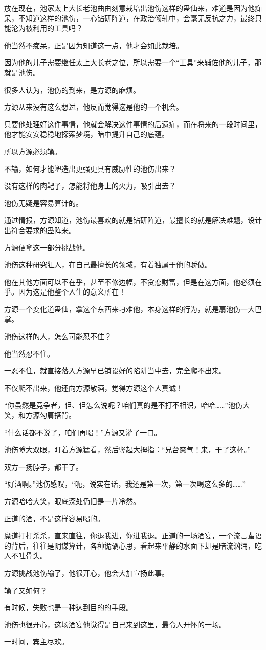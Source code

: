 \begin{this_body}
放在现在，池家太上大长老池曲由刻意栽培出池伤这样的蛊仙来，难道是因为他痴呆，不知道这样的池伤，一心钻研阵道，在政治倾轧中，会毫无反抗之力，最终只能沦为被利用的工具吗？

他当然不痴呆，正是因为知道这一点，他才会如此栽培。

因为他的儿子需要继任太上大长老之位，所以需要一个“工具”来辅佐他的儿子，那就是池伤。

很多人认为，池伤的到来，是方源的麻烦。

方源从来没有这么想过，他反而觉得这是他的一个机会。

只要他处理好这件事情，他就会解决这件事情的后遗症，而在将来的一段时间里，他才能安安稳稳地探索梦境，暗中提升自己的底蕴。

所以方源必须输。

不输，如何才能塑造出更强更具有威胁性的池伤出来？

没有这样的肉靶子，怎能将他身上的火力，吸引出去？

池伤无疑是容易算计的。

通过情报，方源知道，池伤最喜欢的就是钻研阵道，最擅长的就是解决难题，设计出符合要求的蛊阵来。

方源便拿这一部分挑战他。

池伤这种研究狂人，在自己最擅长的领域，有着独属于他的骄傲。

他在其他方面可以不在乎，甚至不修边幅，不贪恋财富，但是在这方面，他必须在乎。因为这是他整个人生的意义所在！

方源一个变化道蛊仙，拿这个东西来刁难他，本身这样的行为，就是扇池伤一大巴掌。

池伤这样的人，怎么可能忍不住？

他当然忍不住。

一忍不住，就直接落入方源早已铺设好的陷阱当中去，完全爬不出来。

不仅爬不出来，他还向方源敬酒，觉得方源这个人真诚！

“你虽然是竞争者，但、但怎么说呢？咱们真的是不打不相识，哈哈……”池伤大笑，和方源勾肩搭背。

“什么话都不说了，咱们再喝！”方源又灌了一口。

池伤瞪大双眼，盯着方源猛看，然后竖起大拇指：“兄台爽气！来，干了这杯。”

双方一扬脖子，都干了。

“好酒啊。”池伤感叹，“呃，说实在话，我还是第一次，第一次喝这么多的……”

方源哈哈大笑，眼底深处仍旧是一片冷然。

正道的酒，不是这样容易喝的。

魔道打打杀杀，直来直往，你退我进，你进我退。正道的一场酒宴，一个流言蜚语的背后，往往是阴谋算计，各种诡谲心思，看起来平静的水面下却是暗流汹涌，吃人不吐骨头。

方源挑战池伤输了，他很开心，他会大加宣扬此事。

输了又如何？

有时候，失败也是一种达到目的的手段。

池伤也很开心，这场酒宴他觉得是自己来到这里，最令人开怀的一场。

一时间，宾主尽欢。

\end{this_body}

